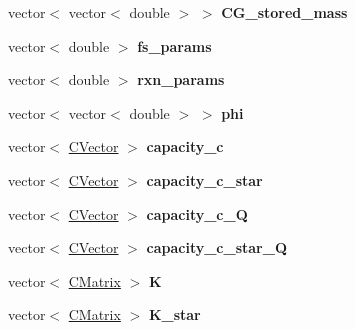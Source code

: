 \begin{DoxyCompactItemize}
\mbox{\label{class_c_m_b_block_a1f2c2408a085b6fb3b009135346690ec}} 
vector$<$ vector$<$ double $>$ $>$ {\bfseries C\+G\+\_\+stored\+\_\+mass}
\item 
\mbox{\label{class_c_m_b_block_ab3204ba1156e53bfdba81d3a299d47c4}} 
vector$<$ double $>$ {\bfseries fs\+\_\+params}
\item 
\mbox{\label{class_c_m_b_block_a1737e35308e1aa213f9a5caca60e23ce}} 
vector$<$ double $>$ {\bfseries rxn\+\_\+params}
\item 
\mbox{\label{class_c_m_b_block_a1d195e638ec2d9a4c8fa7c3c166018ee}} 
vector$<$ vector$<$ double $>$ $>$ {\bfseries phi}
\item 
\mbox{\label{class_c_m_b_block_a005ae1ae6c3ab9f35736291626b32f33}} 
vector$<$ \hyperlink{class_c_vector}{C\+Vector} $>$ {\bfseries capacity\+\_\+c}
\item 
\mbox{\label{class_c_m_b_block_ad4817e993b2a82c93958a09770f50de9}} 
vector$<$ \hyperlink{class_c_vector}{C\+Vector} $>$ {\bfseries capacity\+\_\+c\+\_\+star}
\item 
\mbox{\label{class_c_m_b_block_a0d5f55d3b7f4120a7a4365b4528354fc}} 
vector$<$ \hyperlink{class_c_vector}{C\+Vector} $>$ {\bfseries capacity\+\_\+c\+\_\+Q}
\item 
\mbox{\label{class_c_m_b_block_a4f6a78ec33f85320a625f6dd44881614}} 
vector$<$ \hyperlink{class_c_vector}{C\+Vector} $>$ {\bfseries capacity\+\_\+c\+\_\+star\+\_\+Q}
\item 
\mbox{\label{class_c_m_b_block_a9eba66b2b15f4b1d452fa4129625aaa3}} 
vector$<$ \hyperlink{class_c_matrix}{C\+Matrix} $>$ {\bfseries K}
\item 
\mbox{\label{class_c_m_b_block_a570c134f9c94fbca2ce49f85489edd72}} 
vector$<$ \hyperlink{class_c_matrix}{C\+Matrix} $>$ {\bfseries K\+\_\+star}
\item 
\mbox{\label{class_c_m_b_block_a4c0293be5f0e5a392f0794d58dab667b}} 

\end{DoxyCompactItemize}
